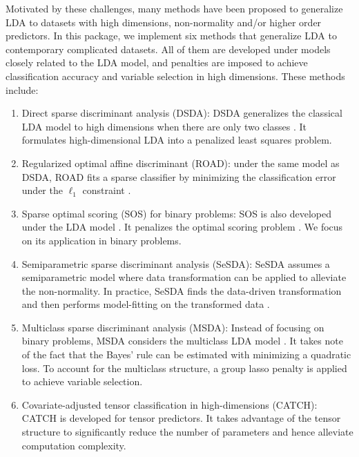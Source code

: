 Motivated by these challenges, many methods have been proposed to generalize LDA to datasets with high dimensions, non-normality and/or higher order predictors. In this package, we implement six methods that generalize LDA to contemporary complicated datasets. All of them are developed under models closely related to the LDA model, and penalties are imposed to achieve classification accuracy and variable selection in high dimensions. These methods include: 
\begin{enumerate}
 \item Direct sparse discriminant analysis (DSDA): DSDA generalizes the classical LDA model to high dimensions when there are only two classes \citep{DSDA}. It formulates high-dimensional LDA into a penalized least squares problem.
 \item Regularized optimal affine discriminant (ROAD): under the same model as DSDA, ROAD  fits a sparse classifier by minimizing the classification error under the $\ell_1$ constraint \citep{ROAD}.
 \item Sparse optimal scoring (SOS) for binary problems: SOS is also developed under the LDA model \citep{Clemmensen}. It penalizes the optimal scoring problem \citep{hastie1994flexible}. We focus on its application in binary problems.
 \item Semiparametric sparse discriminant analysis (SeSDA): SeSDA assumes a semiparametric model where data transformation can be applied to alleviate the non-normality. In practice, SeSDA finds the data-driven transformation and then performs model-fitting on the transformed data \citep{Mai2015ssda}. 
 \item Multiclass sparse discriminant analysis (MSDA):  Instead of focusing on binary problems, MSDA considers the multiclass LDA model \citep{MSDA}. It takes note of the fact that the Bayes' rule can be estimated with minimizing a quadratic loss. To account for the multiclass structure, a group lasso penalty \citep{yuan2006model} is applied to achieve variable selection.
 
 \item Covariate-adjusted tensor classification in high-dimensions (CATCH):
 CATCH \citep{catch} is developed for tensor predictors. It takes advantage of the tensor structure to significantly reduce the number of parameters and hence alleviate computation complexity. 
 
\end{enumerate}


